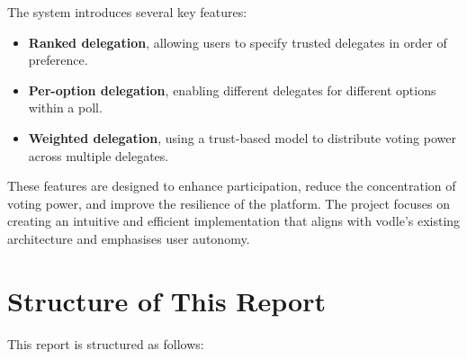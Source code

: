 The system introduces several key features:
\begin{itemize}
  \item \textbf{Ranked delegation}, allowing users to specify trusted delegates in order of preference.
  \item \textbf{Per-option delegation}, enabling different delegates for different options within a poll.
  \item \textbf{Weighted delegation}, using a trust-based model to distribute voting power across multiple delegates.
\end{itemize}

These features are designed to enhance participation, reduce the concentration of voting power, and improve the resilience of the platform. The project focuses on creating an intuitive and efficient implementation that aligns with vodle's existing architecture and emphasises user autonomy.

\section{Structure of This Report}

This report is structured as follows:

